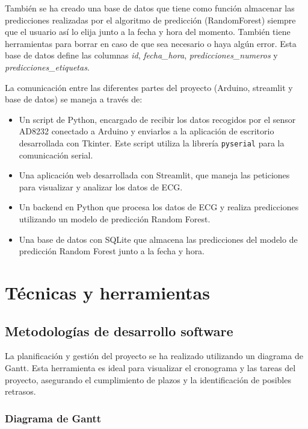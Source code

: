También se ha creado una base de datos que tiene como función almacenar las predicciones realizadas por el algoritmo de predicción (RandomForest) siempre que el usuario así lo elija junto a la fecha y hora del momento. También tiene herramientas para borrar en caso de que sea necesario o haya algún error. Esta base de datos define las columnas \textit{id}, \textit{fecha\_hora}, \textit{predicciones\_numeros} y \textit{predicciones\_etiquetas}.


La comunicación entre las diferentes partes del proyecto (Arduino, streamlit y base de datos) se maneja a través de:

\begin{itemize}
\item Un script de Python, encargado de recibir los datos recogidos por el sensor AD8232 conectado a Arduino y enviarlos a la aplicación de escritorio desarrollada con Tkinter. Este script utiliza la librería \texttt{pyserial} para la comunicación serial.
\item Una aplicación web desarrollada con Streamlit, que maneja las peticiones para visualizar y analizar los datos de ECG.
\item Un backend en Python que procesa los datos de ECG y realiza predicciones utilizando un modelo de predicción Random Forest.
\item Una base de datos con SQLite que almacena las predicciones del modelo de predicción Random Forest junto a la fecha y hora.
\end{itemize}

\section{Técnicas y herramientas}

\subsection{Metodologías de desarrollo software}

La planificación y gestión del proyecto se ha realizado utilizando un diagrama de Gantt. Esta herramienta es ideal para visualizar el cronograma y las tareas del proyecto, asegurando el cumplimiento de plazos y la identificación de posibles retrasos.

\subsubsection{Diagrama de Gantt}

